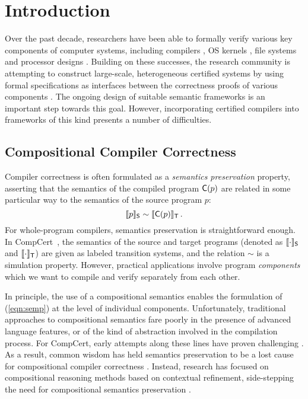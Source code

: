 \section{Introduction}
\label{sec:intro}

Over the past decade, researchers have been able to formally verify
various key components of computer systems, including compilers
\cite{compcert,cakeml,vellvm}, OS kernels \cite{klein2009sel4,dscal15,certikos-osdi16},
file systems \cite{fscq} and processor designs \cite{safe,kami}.
Building on these successes, the research community is attempting to
construct large-scale, heterogeneous certified systems by using formal
specifications as interfaces between the correctness proofs of various
components \cite{deepspec}.  The ongoing design of suitable semantic
frameworks is an important step towards this goal.  However,
incorporating certified compilers into frameworks of this kind
presents a number of difficulties.

\subsection{Compositional Compiler Correctness}
\label{ssec:intro-ccc}

Compiler correctness is often formulated as a \emph{semantics
preservation} property, asserting that the semantics of the compiled
program $ \mathsf{C} (p)$ are related in some particular way to the
semantics of the source program $p$:
\begin{equation} \label{eqn:semp}
  \llbracket p \rrbracket_{ \mathsf{S} } \sim
  \llbracket  \mathsf{C} (p) \rrbracket_{ \mathsf{T} }
  \,.
\end{equation}
For whole-program compilers, semantics preservation is straightforward
enough.  In CompCert~\cite{compcert}, the semantics of the source and
target programs (denoted as $\llbracket \cdot \rrbracket_{ \mathsf{S} }$
and $\llbracket \cdot \rrbracket_{ \mathsf{T} }$)
are given as labeled transition systems, and the
relation $\sim$ is a simulation property.
However, practical applications involve program \emph{components}
which we want to compile and verify separately from each other.

In
principle, the use of a compositional semantics enables the
formulation of (\ref{eqn:semp}) at the level of individual components.
Unfortunately, traditional approaches to compositional semantics fare
poorly in the presence of advanced language features, or of the kind
of abstraction involved in the compilation process.  For CompCert,
early attempts along these lines have proven challenging
\cite{cpp15,compcompcert}.
%
As a result, common wisdom has held semantics preservation to be a lost
cause for compositional compiler correctness \cite{next700}.  Instead,
research has focused on compositional reasoning methods based on
contextual refinement, side-stepping the need for compositional
semantics preservation \cite{sepcompcert,compcertm}.


